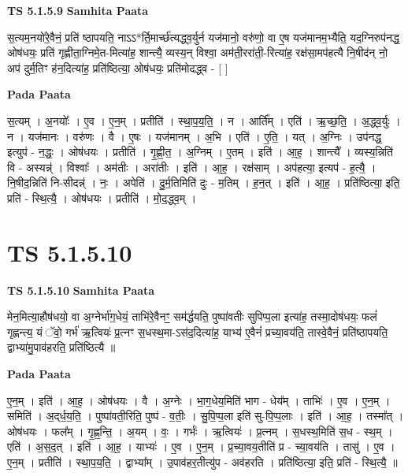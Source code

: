\documentclass[17pt]{extarticle}
\begin{document}
\textbf{TS 5.1.5.9 } \newline
\textbf{Samhita Paata} \newline

स॒त्यम॒नयो॑रे॒वैनं॒ प्रति॑ ष्ठापयति॒ नाऽऽ*र्ति॒मार्च्छ॑त्यद्ध्व॒र्युर्न यज॑मानो॒ वरु॑णो॒ वा ए॒ष यज॑मानम॒भ्यैति॒ यद॒ग्निरुप॑नद्ध॒ ओष॑धयः॒ प्रति॑ गृह्णीता॒ग्निमे॒त-मित्या॑ह॒ शान्त्यै॒ व्यस्य॒न् विश्वा॒ अम॑ती॒ररा॑ती॒-रित्या॑ह॒ रक्ष॑सा॒मप॑हत्यै नि॒षीद॑न् नो॒ अप॑ दुर्म॒तिꣳ ह॑न॒दित्या॑ह॒ प्रति॑ष्ठित्या॒ ओष॑धयः॒ प्रति॑मोदद्ध्व - [  ] \newline

\textbf{Pada Paata} \newline

स॒त्यम् । अ॒नयोः᳚ । ए॒व । ए॒न॒म् । प्रतीति॑ । स्था॒प॒य॒ति॒ । न । आर्ति᳚म् । एति॑ । ऋ॒च्छ॒ति॒ । अ॒द्ध्व॒र्युः । न । यज॑मानः । वरु॑णः । वै । ए॒षः । यज॑मानम् । अ॒भि । एति॑ । ए॒ति॒ । यत् । अ॒ग्निः । उप॑नद्ध॒ इत्युप॑ - न॒द्धः॒ । ओष॑धयः । प्रतीति॑ । गृ॒ह्णी॒त॒ । अ॒ग्निम् । ए॒तम् । इति॑ । आ॒ह॒ । शान्त्यै᳚ । व्यस्य॒न्निति॑ वि - अस्यन्न्॑ । विश्वाः᳚ । अम॑तीः । अरा॑तीः । इति॑ । आ॒ह॒ । रक्ष॑साम् । अप॑हत्या॒ इत्यप॑ - ह॒त्यै॒ । नि॒षीद॒न्निति॑ नि-सीदन्न्॑ । नः॒ । अपेति॑ । दु॒र्म॒तिमिति॑ दुः - म॒तिम् । ह॒न॒त् । इति॑ । आ॒ह॒ । प्रति॑ष्ठित्या॒ इति॒ प्रति॑ - स्थि॒त्यै॒ । ओष॑धयः । प्रतीति॑ । मो॒द॒द्ध्व॒म् ।  \newline





\section{ TS 5.1.5.10 }

\textbf{TS 5.1.5.10 } \newline
\textbf{Samhita Paata} \newline

मेन॒मित्या॒हौष॑धयो॒ वा अ॒ग्नेर्भा॑ग॒धेयं॒ ताभि॑रे॒वैनꣳ॒॒ सम॑र्द्धयति॒ पुष्पा॑वतीः सुपिप्प॒ला इत्या॑ह॒ तस्मा॒दोष॑धयः॒ फलं॑ गृह्णन्त्य॒ यं ॅवो॒ गर्भ॑ ऋ॒त्वियः॑ प्र॒त्नꣳ स॒धस्थ॒मा-ऽस॑द॒दित्या॑ह॒ याभ्य॑ ए॒वैनं॑ प्रच्या॒वय॑ति॒ तास्वे॒वैनं॒ प्रति॑ष्ठापयति॒ द्वाभ्या॑मु॒पाव॑हरति॒ प्रति॑ष्ठित्यै ॥ \newline

\textbf{Pada Paata} \newline

ए॒न॒म् । इति॑ । आ॒ह॒ । ओष॑धयः । वै । अ॒ग्नेः । भा॒ग॒धेय॒मिति॑ भाग - धेय᳚म् । ताभिः॑ । ए॒व । ए॒न॒म् । समिति॑ । अ॒द्‌र्ध॒य॒ति॒ । पुष्पा॑वती॒रिति॒ पुष्प॑ - व॒तीः॒ । सु॒पि॒प्प॒ला इति॑ सु-पि॒प्प॒लाः । इति॑ । आ॒ह॒ । तस्मा᳚त् । ओष॑धयः । फल᳚म् । गृ॒ह्ण॒न्ति॒ । अ॒यम् । वः॒ । गर्भः॑ । ऋ॒त्वियः॑ । प्र॒त्नम् । स॒धस्थ॒मिति॑ स॒ध - स्थ॒म् । एति॑ । अ॒स॒द॒त् । इति॑ । आ॒ह॒ । याभ्यः॑ । ए॒व । ए॒न॒म् । प्र॒च्या॒वय॒तीति॑ प्र - च्या॒वय॑ति । तासु॑ । ए॒व । ए॒न॒म् । प्रतीति॑ । स्था॒प॒य॒ति॒ । द्वाभ्या᳚म् । उ॒पाव॑हर॒तीत्यु॑प - अव॑हरति । प्रति॑ष्ठित्या॒ इति॒ प्रति॑ - स्थि॒त्यै॒ ॥  \newline
\end{document}
